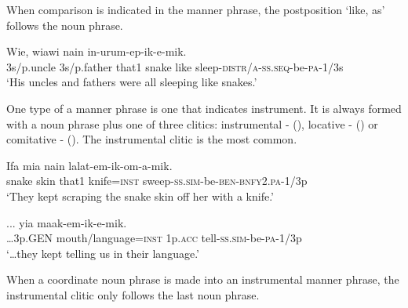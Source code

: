 When comparison is indicated in the manner phrase, the postposition  `like, as' follows the noun phrase.

\ea%
\label{ex:x885}
\gll Wie,  wiawi  nain    in-urum-ep-ik-e-mik.\\
  3s/p.uncle  3s/p.father  that1  snake  like  sleep-\textsc{distr}/\textsc{a}-\textsc{ss}.\textsc{seq}-be-\textsc{pa}-1/3s    \\
\glt`His uncles and fathers were all sleeping like snakes.'
\z









One type of a manner phrase is one that indicates instrument.  It is always formed with a noun phrase plus one of three clitics: instrumental -\textstyleStyleVernacularWordsItalic{} (), locative -  ()\textstyleStyleVernacularWordsItalic{} or comitative -\textstyleStyleVernacularWordsItalic{} (). The instrumental clitic is the most common. 

\ea%
\label{ex:x886}
\gll Ifa  mia  nain    lalat-em-ik-om-a-mik. \\
  snake  skin  that1  knife=\textsc{inst}  sweep-\textsc{ss}.\textsc{sim}-be-\textsc{ben}-\textsc{bnfy}2.\textsc{pa}-1/3p    \\
\glt`They kept scraping the snake skin off her with a knife.'
\z





\ea%
\label{ex:x889}
\gll ...   yia  maak-em-ik-e-mik. \\
 {\dots}3p.GEN  mouth/language=\textsc{inst}  1p.\textsc{acc}  tell-\textsc{ss}.\textsc{sim}-be-\textsc{pa}-1/3p     \\
\glt`{\dots}they kept telling us in their language.'
\z





When a coordinate noun phrase is made into an instrumental manner phrase, the instrumental clitic only follows the last noun phrase.

